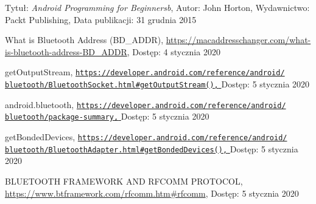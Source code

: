 \documentclass[a4paper,12pt, twoside]{article}
\begin{document}
\begin{thebibliography}{}
    		Tytuł: \textit{Android Programming for Beginnersb}, \newline
    	    Autor: John Horton, \newline
    	    Wydawnictwo: Packt Publishing,
    		\newline Data publikacji: 31 grudnia 2015
    		
    		What is Bluetooth Address (BD\_ADDR),
    		\newline\url{https://macaddresschanger.com/what-is-bluetooth-address-BD_ADDR}, 
    		\newline Dostęp: 4 stycznia 2020
    		
    		getOutputStream,
    		\newline\href{https://developer.android.com/reference/android/bluetooth/BluetoothSocket.html\#getOutputStream()}
    		 {\nolinkurl{https://developer.android.com/reference/android/}
                 \\
                  \nolinkurl{bluetooth/BluetoothSocket.html\#getOutputStream(),}
                 }
    		\newline Dostęp: 5 stycznia 2020
    		
    		android.bluetooth,
    		\newline\href{https://developer.android.com/reference/android/bluetooth/}
    		 {\nolinkurl{https://developer.android.com/reference/android/}
                 \\
                  \nolinkurl{bluetooth/package-summary,}
                 }
    		\newline Dostęp: 5 stycznia 2020
    		
    		getBondedDevices,
    		\newline\href{https://developer.android.com/reference/android/bluetooth/BluetoothAdapter.html\#getBondedDevices()}
    		 {\nolinkurl{https://developer.android.com/reference/android/}
                 \\
                  \nolinkurl{bluetooth/BluetoothAdapter.html\#getBondedDevices(),}
                 }
    		\newline Dostęp: 5 stycznia 2020
    		
    		BLUETOOTH FRAMEWORK AND RFCOMM PROTOCOL,
    		\newline\url{https://www.btframework.com/rfcomm.htm#rfcomm}, 
    		\newline Dostęp: 5 stycznia 2020
    		
    	\end{thebibliography}
    	\endgroup
    	
\end{document}
